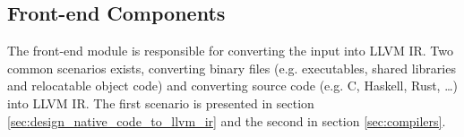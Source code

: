 
\subsection{Front-end Components}
\label{sec:front-end_components}


The front-end module is responsible for converting the input into LLVM IR. Two common scenarios exists, converting binary files (e.g. executables, shared libraries and relocatable object code) and converting source code (e.g. C, Haskell, Rust, …) into LLVM IR. The first scenario is presented in section \ref{sec:design_native_code_to_llvm_ir} and the second in section \ref{sec:compilers}.




